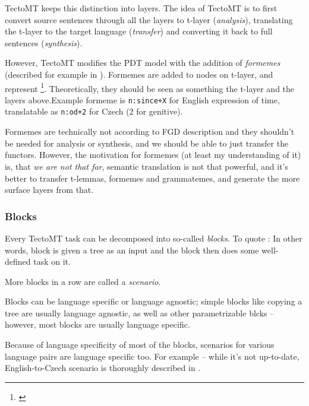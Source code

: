 TectoMT keeps this distinction into layers. 
The idea of TectoMT is to first convert source sentences through all the layers to t-layer (\emph{analysis}), translating the t-layer to the target language (\emph{transfer}) and converting it back to full sentences (\emph{synthesis}).

However, TectoMT modifies the PDT model with the addition of \emph{formemes} (described for example in \cite{zabokrtsky_hab}). Formemes are added to nodes on t-layer, and represent \footnote{\cite{zabokrtsky_hab}}. Theoretically, they should be seen as something  the t-layer and the layers above.Example formeme is \texttt{n:since+X} for English expression of time, translatable as \texttt{n:od+2} for Czech (2 for genitive).

Formemes are technically not  according to FGD description and they shouldn't be needed for analysis or synthesis, and we should be able to just transfer the functors. However, the motivation for formemes (at least my understanding of it) is, that \emph{we are not that far},  semantic translation is not that powerful, and it's better to transfer t-lemmas, formemes and grammatemes, and generate the more surface layers from that.

\subsubsection{Blocks}

Every TectoMT task can be decomposed into so-called \emph{blocks}. To quote \cite{zabokrtsky}:  In other words, block is given a tree as an input and the block then does some well-defined task on it.

More blocks in a row are called a \emph{scenario}.

Blocks can be language specific or language agnostic; simple blocks like copying a tree are usually language agnostic, as well as other parametrizable blcks -- however, most blocks are usually language specific.

Because of language specificity of most of the blocks, scenarios for various language pairs are language specific too. For example -- while it's not up-to-date, English-to-Czech scenario is thoroughly described in \cite{zabokrtsky}.

